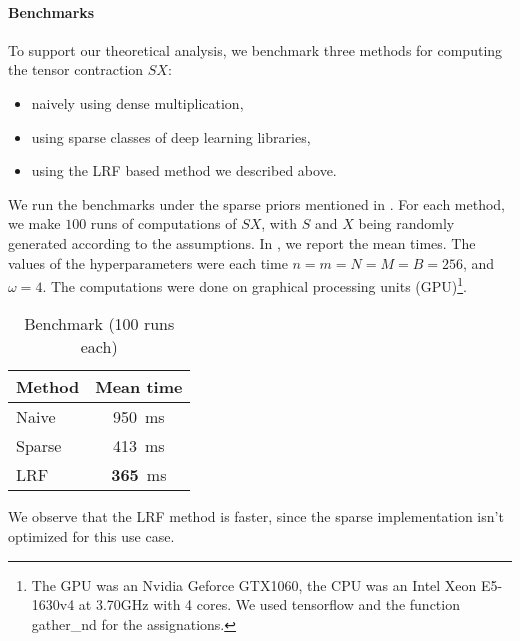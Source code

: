 \paragraph{Benchmarks}
To support our theoretical analysis, we benchmark three methods for computing the tensor contraction $SX$:
\begin{itemize}[nolistsep,noitemsep]
  \item naively using dense multiplication,
  \item using sparse classes of deep learning libraries,
  \item using the LRF based method we described above.
\end{itemize}

We run the benchmarks under the sparse priors mentioned in . For each method, we make $100$ runs of computations of $SX$, with $S$ and $X$ being randomly generated according to the assumptions. In , we report the mean times. The values of the hyperparameters were each time $n = m = N = M = B = 256$, and $\omega = 4$. The computations were done on graphical processing units (GPU)\footnote{The GPU was an Nvidia Geforce GTX1060, the CPU was an Intel Xeon E5-1630v4 at 3.70GHz with 4 cores. We used tensorflow and the function gather\_nd for the assignations.}.

\begin{table}[H]
  \centering
\begin{tabular}{lc}
  Method & Mean time\\
  \hline
  Naive & 950~ms\\
  Sparse & 413~ms\\
  LRF & \textbf{365}~ms
\end{tabular}
\caption{Benchmark (100 runs each)}
\label{tab:ben}
\end{table}

We observe that the LRF method is faster, since the sparse implementation isn't optimized for this use case.

